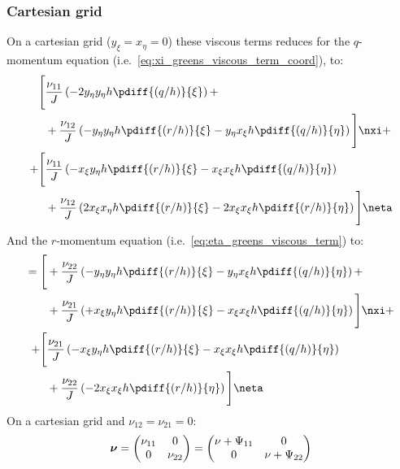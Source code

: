  \subsubsection*{Cartesian grid}
On a cartesian grid ($y_\xi = x_\eta = 0$) these viscous terms reduces for the $q$-momentum equation (i.e.\ \autoref{eq:xi_greens_viscous_term_coord}), to:
%
\begin{align}
    \Bigg[ &  \frac{\nu_{11}}{J} \left(
    - 2 y_{\eta} y_{\eta} h \pdiff{(q/h)}{\xi}
    \right)
    +
    \\* & +
    \frac{\nu_{12}}{J} \left(
    - y_{\eta}y_{\eta} h \pdiff{(r/h)}{\xi}
    - y_{\eta}x_{\xi} h \pdiff{(q/h)}{\eta} \right)
    \Bigg] \nxi +
    \\
    + \Bigg[ &
    \frac{\nu_{11}}{J} \left(
    - x_{\xi}y_{\eta} h \pdiff{(r/h)}{\xi}
    - x_{\xi}x_{\xi} h \pdiff{(q/h)}{\eta}
    \right)
    \\* & +
    \frac{\nu_{12}}{J} \left(
    2 x_{\xi}x_{\eta} h \pdiff{(r/h)}{\xi}
    - 2 x_{\xi}x_{\xi} h \pdiff{(r/h)}{\eta}
    \right)
    \Bigg] \neta
\end{align}
%
And the $r$-momentum equation (i.e.\ \autoref{eq:eta_greens_viscous_term}) to:
%
\begin{align}
    = \Bigg[
    & + \frac{\nu_{22}}{J} \left(
    - y_{\eta} y_{\eta} h \pdiff{(r/h)}{\xi}
    - y_{\eta} x_{\xi} h \pdiff{(q/h)}{\eta}
    \right)
    +
    \\
    & + \frac{\nu_{21}}{J} \left(
    + x_{\xi} y_{\eta} h \pdiff{(r/h)}{\xi}
    - x_{\xi} x_{\xi} h \pdiff{(q/h)}{\eta}
    \right)
    \Bigg] \nxi +
    \\
    + \Bigg[ &
    \frac{\nu_{21}}{J} \left(
    - x_{\xi}y_{\eta} h \pdiff{(r/h)}{\xi}
    - x_{\xi}x_{\xi} h \pdiff{(q/h)}{\eta}
    \right)
    \\* & +
    \frac{\nu_{22}}{J} \left(
    - 2 x_{\xi}x_{\xi} h \pdiff{(r/h)}{\eta}
    \right)
    \Bigg] \neta
\end{align}
%
On a cartesian grid and $\nu_{12} = \nu_{21} = 0$:
\begin{align}
    \mbox{\boldmath ${\mathrm{\nu}}$} =
    \begin{pmatrix}
        \nu_{11} & 0 \\
        0  & \nu_{22}
    \end{pmatrix}=
    \begin{pmatrix}
        \nu + \Psi_{11} & 0 \\
        0  & \nu + \Psi_{22}
    \end{pmatrix}
\end{align}
